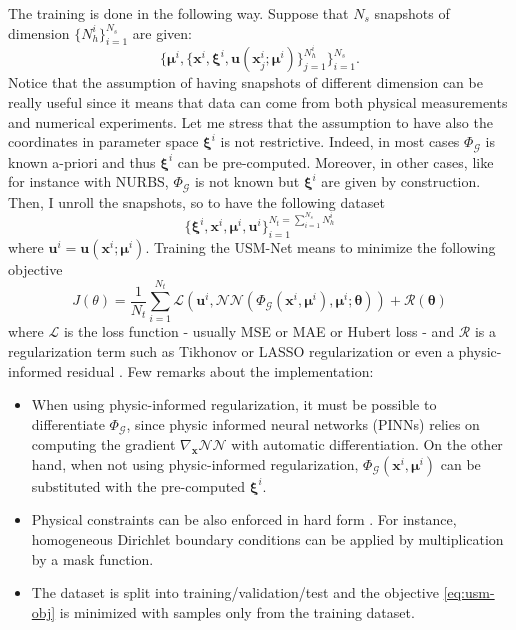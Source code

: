 \documentclass[11pt]{article}
\begin{document}
The training is done in the following way. Suppose that $N_s$ snapshots of dimension $\{N_h^i\}_{i=1}^{N_s}$ are given:
$$\{\boldsymbol \mu^i,\{\mathbf x^i, \boldsymbol \xi^i, \mathbf u(\mathbf x^i_j;\boldsymbol \mu^i)\}_{j=1}^{N_h^i}\}_{i=1}^{N_s}.$$
Notice that the assumption of having snapshots of different dimension can be really useful since it means that data can come from both physical measurements and numerical experiments. 
Let me stress that the assumption to have also the coordinates in parameter space $\boldsymbol \xi^i$ is not restrictive. Indeed, in most cases $\Phi_{\mathcal G}$ is known a-priori and thus $\boldsymbol \xi^i$ can be pre-computed. Moreover, in other cases, like for instance with NURBS, $\Phi_{\mathcal G}$ is not known but $\boldsymbol \xi^i$ are given by construction. Then, I unroll the snapshots, so to have the following dataset
$$\{\boldsymbol \xi^i, \mathbf x^i, \boldsymbol \mu^i, \mathbf u^i\}_{i=1}^{N_t=\sum_{i=1}^{N_s}N_h^i}$$
where $\mathbf u^i = \mathbf u(\mathbf x^i; \boldsymbol \mu^i)$. Training the USM-Net means to minimize the following objective
\begin{equation}
   J(\theta) = \frac{1}{N_t}\sum_{i = 1}^{N_t} \mathcal L(\mathbf u^i, \mathcal{NN}(\Phi_{\mathcal G}(\mathbf x^i, \boldsymbol \mu^i), \boldsymbol \mu^i; \boldsymbol \theta)) + \mathcal R(\boldsymbol \theta)
\label{eq:usm-obj}
\end{equation}
where $\mathcal L$ is the loss function - usually MSE or MAE or Hubert loss - and $\mathcal R$ is a regularization term such as Tikhonov or LASSO regularization or even a physic-informed residual \cite{raissi2019physics}. Few remarks about the implementation:
\begin{itemize}
    \item When using physic-informed regularization, it must be possible to differentiate $\Phi_{\mathcal G}$, since physic informed neural networks (PINNs) relies on computing the gradient $\nabla_{\mathbf x} \mathcal{NN}$ with automatic differentiation. On the other hand, when not using physic-informed regularization, $\Phi_{\mathcal G}(\mathbf x^i, \boldsymbol \mu^i)$ can be substituted with the pre-computed $\boldsymbol \xi^i$.
    \item Physical constraints can be also enforced in hard form \cite{lu2021physics}. For instance, homogeneous Dirichlet boundary conditions can be applied by multiplication by a mask function.
    \item The dataset is split into training/validation/test and the objective \ref{eq:usm-obj} is minimized with samples only from the training dataset.
\end{itemize}
\end{document}

